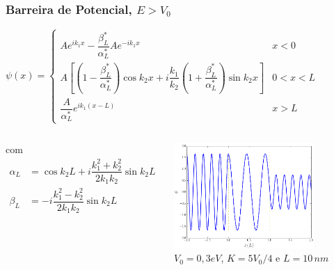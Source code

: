\documentclass[12pt,brazil,table]{beamer}
\begin{document}
\begin{frame}
  \frametitle{Barreira de Potencial, $E>V_0$}

  \fontsize{8pt}{11pt}\selectfont
  
  \vspace*{-1cm}
  \begin{minipage}[t][20ex][t]{\linewidth}
     $
     \psi(x) =\begin{cases} Ae^{ik_1x}-\dfrac{\beta_L^*}{\alpha_L^*}Ae^{-ik_1x} & x < 0\\
          A\left[ \left( 1-\dfrac{\beta_L^*}{\alpha_L^*} \right)\cos k_2x+ i\dfrac{k_1}{k_2}\left( 1+ \dfrac{\beta_L^*}{\alpha_L^*}\right)\sin k_2x\right] & 0 < x < L\\
          \dfrac{A}{\alpha_L^*}e^{ik_1(x-L)} & x > L
          \end{cases}
    $

  \end{minipage}

  
  \vspace*{-0.5cm}
  \begin{minipage}[b][20ex][t]{\linewidth}
  \begin{columns}
   
    
      
    com
     \begin{align*}
            \alpha_L &= \cos k_2L + i\dfrac{k_1^2+k_2^2}{2k_1k_2}\sin k_2L\\
            \beta_L &= -i\dfrac{k_1^2-k_2^2}{2k_1k_2}\sin k_2L
          \end{align*}
    

    
    
    \begin{center}
     \includegraphics[height=4cm]{figuras/fig35}\\
    \fontsize{8pt}{11pt}\selectfont
    $V_0=0,3eV$, $K=5V_0/4$ e $L=10\,nm$
    \end{center}
   
  \end{columns}
  \end{minipage}

\end{frame}
\end{document}
